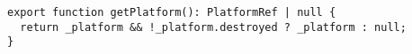 \begin{verbatim}
export function getPlatform(): PlatformRef | null {
  return _platform && !_platform.destroyed ? _platform : null;
}
\end{verbatim}
